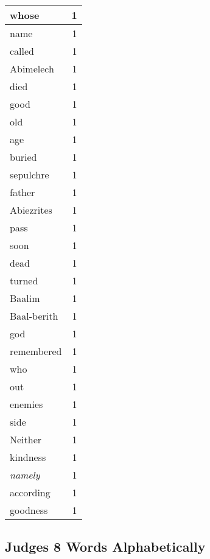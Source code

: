 \begin{center}
\begin{longtable}{l|r}
whose & 1\\ \hline 
name & 1\\ \hline 
called & 1\\ \hline 
Abimelech & 1\\ \hline 
died & 1\\ \hline 
good & 1\\ \hline 
old & 1\\ \hline 
age & 1\\ \hline 
buried & 1\\ \hline 
sepulchre & 1\\ \hline 
father & 1\\ \hline 
Abiezrites & 1\\ \hline 
pass & 1\\ \hline 
soon & 1\\ \hline 
dead & 1\\ \hline 
turned & 1\\ \hline 
Baalim & 1\\ \hline 
Baal-berith & 1\\ \hline 
god & 1\\ \hline 
remembered & 1\\ \hline 
who & 1\\ \hline 
out & 1\\ \hline 
enemies & 1\\ \hline 
side & 1\\ \hline 
Neither & 1\\ \hline 
kindness & 1\\ \hline 
\emph{namely} & 1\\ \hline 
according & 1\\ \hline 
goodness & 1\\ \hline 
\end{longtable}
\end{center}





\subsection{Judges 8 Words Alphabetically}


\normalsize
 
